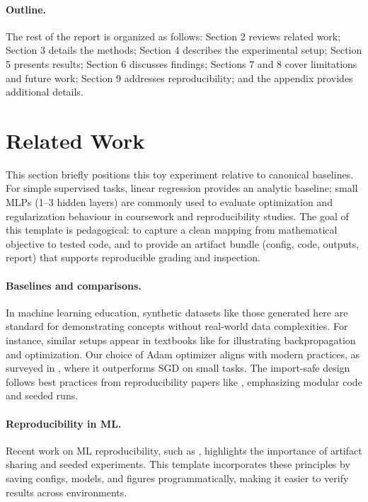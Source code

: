 \documentclass[11pt]{article}
\begin{document}
\paragraph{Outline.} The rest of the report is organized as follows: Section 2 reviews related work; Section 3 details the methods; Section 4 describes the experimental setup; Section 5 presents results; Section 6 discusses findings; Sections 7 and 8 cover limitations and future work; Section 9 addresses reproducibility; and the appendix provides additional details.

\section{Related Work}
This section briefly positions this toy experiment relative to canonical baselines. For simple supervised tasks, linear regression provides an analytic baseline; small MLPs (1--3 hidden layers) are commonly used to evaluate optimization and regularization behaviour in coursework and reproducibility studies. The goal of this template is pedagogical: to capture a clean mapping from mathematical objective to tested code, and to provide an artifact bundle (config, code, outputs, report) that supports reproducible grading and inspection.

\paragraph{Baselines and comparisons.} In machine learning education, synthetic datasets like those generated here are standard for demonstrating concepts without real-world data complexities. For instance, similar setups appear in textbooks like \cite{goodfellow} for illustrating backpropagation and optimization. Our choice of Adam optimizer aligns with modern practices, as surveyed in \cite{kingma2014adam}, where it outperforms SGD on small tasks. The import-safe design follows best practices from reproducibility papers like \cite{pineau2021improving}, emphasizing modular code and seeded runs.

\paragraph{Reproducibility in ML.} Recent work on ML reproducibility, such as \cite{henderson2018deep}, highlights the importance of artifact sharing and seeded experiments. This template incorporates these principles by saving configs, models, and figures programmatically, making it easier to verify results across environments.
\end{document}
